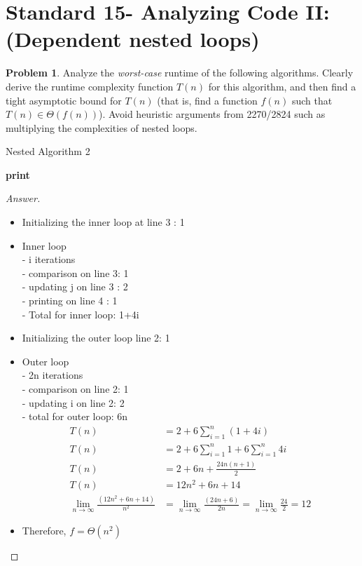 \documentclass[11pt]{article}
\theoremstyle{definition}
\theoremstyle{definition}
\newtheorem{required}{Problem}
\theoremstyle{definition}
\begin{document}
\newpage
\section{Standard 15- Analyzing Code II: (Dependent nested loops)}
\begin{required}


Analyze the \textit{worst-case} runtime of the following algorithms. Clearly derive the runtime complexity function $T(n)$ for this algorithm, and then find a tight asymptotic bound for $T(n)$ (that is, find a function $f(n)$ such that $T(n) \in \Theta(f(n))$). Avoid heuristic arguments from 2270/2824 such as multiplying the complexities of nested loops.


\begin{algorithm}
\caption{Nested Algorithm 2}\label{alg:NestedDependent1}
\begin{algorithmic}[1]
		\State \textbf{print} 
	\EndFor
\EndFor
\EndProcedure
\end{algorithmic}
\end{algorithm}
\end{required}

\begin{proof}[Answer] $ $ \\
\begin{itemize}
    \item Initializing the inner loop at line 3 : 1
    \item Inner loop \\
    - i iterations \\
    - comparison on line 3: 1 \\
    - updating j on line 3 : 2 \\
    - printing on line 4 : 1  \\
    - Total for inner loop: 1+4i
    \item Initializing the outer loop line 2: 1 
    \item Outer loop \\
    - 2n iterations \\
    - comparison on line 2: 1 \\
    - updating i on line 2: 2 \\
    - total for outer loop: 6n 
    \begin{align*}
        T(n) &= 2 + 6\sum_{i=1}^{n} (1+4i) \\
         T(n) &= 2 + 6\sum_{i=1}^{n}1 + 6\sum_{i=1}^{n}4i \\
         T(n) &= 2 + 6n + \frac{24n(n+1)}{2} \\
          T(n) &= 12n^2 + 6n +14 \\
          \lim_{n \to \infty} \frac{(12n^2+6n+14)}{n^2} &= \lim_{n \to \infty} \frac{(24n + 6)}{2n}  = \lim_{n \to \infty} \frac{24}{2} = 12
    \end{align*}
    \item Therefore, $f = \Theta(n^2)$
\end{itemize}
\end{proof}
\end{document}
